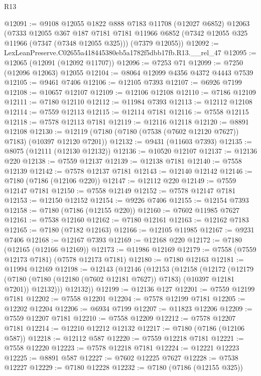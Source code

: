 \begin{lexlean}{R13}
\begin{coremodule}
@12091 := @9108
    @12055
    @1822
    @888
    @7183
    @11708
    (@12027 @6852)
    @12063
    (@7333
      @12055
      @367
      @187
      @7181
      @7181
      @11966
      @6852
      (@7342 @12055 @325 @11966 (@7347 (@7348 @12055 @325)))
      (@7379 @12055))
@12092 := LexLeanPreserve.C02655a418445380eb5a1782f5dbb17fb.R13.__rel_47
@12095 := @12065 (@12091 (@12092 @11707))
@12096 := @7253 @71
@12099 := @7250 (@12096 @12063) @12055
@12104 := @8064 @12099 @4356 @4372 @4443 @7539
@12105 := @9461 @7406
@12106 := @12105 @7393
@12107 := @6926 @7199
@12108 := @10657 @12107
@12109 := @12106 @12108
@12110 := @7186 @12109
@12111 := @7180 @12110
@12112 := @11984 @7393
@12113 := @12112 @12108
@12114 := @7559 @12113
@12115 := @12114 @7181
@12116 := @7558 @12115
@12118 := @7578 @12113 @7181
@12119 := @12116 @12118
@12120 := @8891 @12108
@12130 := @12119 (@7180 (@7180 (@7538 (@7602 @12120 @7627)) @7183) (@10397 @12120 @7201))
@12132 := @9431 (@11603 @7393)
@12135 := @8075 (@12111 (@12130 @12132))
@12136 := @10520 @12107
@12137 := @12136 @220
@12138 := @7559 @12137
@12139 := @12138 @7181
@12140 := @7558 @12139
@12142 := @7578 @12137 @7181
@12143 := @12140 @12142
@12146 := @7180 (@7186 (@12106 @220))
@12147 := @12112 @220
@12149 := @7559 @12147 @7181
@12150 := @7558 @12149
@12152 := @7578 @12147 @7181
@12153 := @12150 @12152
@12154 := @9226 @7406
@12155 := @12154 @7393
@12158 := @7180 (@7186 (@12155 @220))
@12160 := @7602 @11985 @7627
@12161 := @7538 @12160
@12162 := @7180 @12161
@12163 := @12162 @7183
@12165 := @7180 (@7182 @12163)
@12166 := @12105 @11985
@12167 := @9231 @7406
@12168 := @12167 @7393
@12169 := @12168 @220
@12172 := @7180 (@12165 (@12166 @12169))
@12173 := @11986 @12169
@12179 := @7558 (@7559 @12173 @7181) (@7578 @12173 @7181)
@12180 := @7180 @12163
@12181 := @11994 @12169
@12198 := @12143
    (@12146
      (@12153
        (@12158
          (@12172
            (@12179
              (@7180 (@7180 (@12180 (@7602 @12181 @7627)) @7183) (@10397 @12181 @7201))
              @12132)))
        @12132))
@12199 := @12136 @127
@12201 := @7559 @12199 @7181
@12202 := @7558 @12201
@12204 := @7578 @12199 @7181
@12205 := @12202 @12204
@12206 := @6934 @7199
@12207 := @11823 @12206
@12209 := @7559 @12207 @7181
@12210 := @7558 @12209
@12212 := @7578 @12207 @7181
@12214 := @12210 @12212 @12132
@12217 := @7180 (@7186 (@12106 @587))
@12218 := @12112 @587
@12220 := @7559 @12218 @7181
@12221 := @7558 @12220
@12223 := @7578 @12218 @7181
@12224 := @12221 @12223
@12225 := @8891 @587
@12227 := @7602 @12225 @7627
@12228 := @7538 @12227
@12229 := @7180 @12228
@12232 := @7180 (@7186 (@12155 @325))

\end{coremodule}
\end{lexlean}

